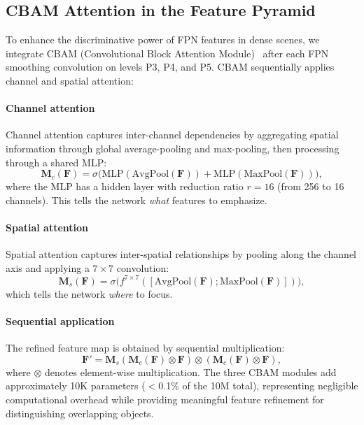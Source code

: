 \documentclass[conference]{IEEEtran}
\begin{document}
\subsection{CBAM Attention in the Feature Pyramid}
\label{sec:cbam}

To enhance the discriminative power of FPN features in dense scenes,
we integrate CBAM (Convolutional Block Attention
Module)~\cite{woo2018cbam} after each FPN smoothing convolution on
levels P3, P4, and P5. CBAM sequentially applies channel and spatial
attention:

\paragraph{Channel attention}
Channel attention captures inter-channel dependencies by aggregating
spatial information through global average-pooling and max-pooling,
then processing through a shared MLP:
\begin{equation}
  \mathbf{M}_c(\mathbf{F}) = \sigma\bigl(\text{MLP}(\text{AvgPool}(\mathbf{F}))
  + \text{MLP}(\text{MaxPool}(\mathbf{F}))\bigr),
  \label{eq:channel_attn}
\end{equation}
where the MLP has a hidden layer with reduction ratio $r=16$ (from 256
to 16 channels). This tells the network \emph{what} features to
emphasize.

\paragraph{Spatial attention}
Spatial attention captures inter-spatial relationships by pooling along
the channel axis and applying a $7 \times 7$ convolution:
\begin{equation}
  \mathbf{M}_s(\mathbf{F}) = \sigma\bigl(f^{7 \times 7}([\text{AvgPool}(\mathbf{F});
  \text{MaxPool}(\mathbf{F})])\bigr),
  \label{eq:spatial_attn}
\end{equation}
which tells the network \emph{where} to focus.

\paragraph{Sequential application}
The refined feature map is obtained by sequential multiplication:
\begin{equation}
  \mathbf{F}' = \mathbf{M}_s(\mathbf{M}_c(\mathbf{F}) \otimes \mathbf{F})
  \otimes (\mathbf{M}_c(\mathbf{F}) \otimes \mathbf{F}),
  \label{eq:cbam_seq}
\end{equation}
where $\otimes$ denotes element-wise multiplication. The three CBAM
modules add approximately 10K parameters ($<$0.1\% of the 10M total),
representing negligible computational overhead while providing
meaningful feature refinement for distinguishing overlapping objects.
\end{document}

